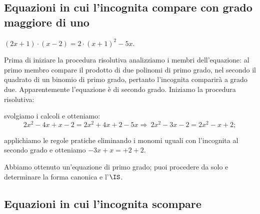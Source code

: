 \ovalbox{\risolvii \ref{ese:15.2}, \ref{ese:15.3}, \ref{ese:15.4}, \ref{ese:15.5}, \ref{ese:15.6}, \ref{ese:15.7}, \ref{ese:15.8}, \ref{ese:15.9}, \ref{ese:15.10}, \ref{ese:15.11}, \ref{ese:15.12}, \ref{ese:15.13},}

\vspace{1.10ex}
\ovalbox{\ref{ese:15.14}, \ref{ese:15.15}}

\subsection{Equazioni in cui l'incognita compare con grado maggiore di uno}
\begin{exrig}
 \begin{esempio}
$(2x+1)\cdot (x-2)=2\cdot (x+1)^{2}-5x$.

Prima di iniziare la procedura risolutiva analizziamo i membri
dell'equazione: al primo membro compare il prodotto
di due polinomi di primo grado, nel secondo il quadrato di un binomio
di primo grado, pertanto l'incognita comparirà a grado due. Apparentemente
l'equazione è di secondo grado. Iniziamo la procedura
risolutiva:
\begin{enumeratea}
\item svolgiamo i calcoli e otteniamo:
\[2x^{2}-4x+x-2=2x^{2}+4x+2-5x\Rightarrow~2x^{2}-3x-2=2x^{2}-x+2;\]
\item applichiamo le regole pratiche eliminando i monomi
uguali con l'incognita al secondo grado e otteniamo
$-3x+x=+2+2$.
\end{enumeratea}

Abbiamo ottenuto un'equazione di primo grado; puoi
procedere da solo e determinare la forma canonica e l'$\IS$.
\end{esempio}
\end{exrig}

\ovalbox{\risolvii \ref{ese:15.16}, \ref{ese:15.17}, \ref{ese:15.18}, \ref{ese:15.19}, \ref{ese:15.20}, \ref{ese:15.21}, \ref{ese:15.22}}

\subsection{Equazioni in cui l'incognita scompare}


